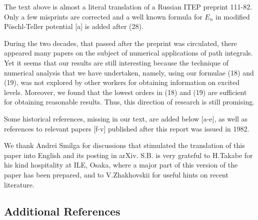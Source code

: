 \documentclass[11pt]{article}
\begin{document}
{\small

The text above is almost a literal translation of a Russian ITEP preprint
111-82. Only a few misprints are corrected and a well known formula
for $E_n$ in modified P\"oschl-Teller potential  [a] is added after (28).

During the two decades, that passed after the preprint was circulated,
there appeared many papers on the subject of numerical applications of path
integrals. Yet it seems that our results are still interesting because the
technique of numerical analysis that we have undertaken, namely, using  our formulae (18) and (19), was not explored by other workers for obtaining information
on excited levels. Moreover, we found that the lowest orders in (18) and (19) 
are sufficient for obtaining reasonable results. Thus, this direction of research
is still promising. 

Some historical references, missing in our text, are added below [a-e], as well
as references to relevant papers [f-v] published after this report was issued in 1982.

We thank Andrei Smilga for discussions that stimulated the translation  of this paper into English and its posting in arXiv. S.B. is very grateful to H.Takabe
for his kind hospitality at ILE, Osaka, where a major part of this version
of the paper has been prepared, and to V.Zhakhovskii for useful hints on recent literature.

\subsection*{ Additional References}

}
\end{document}
